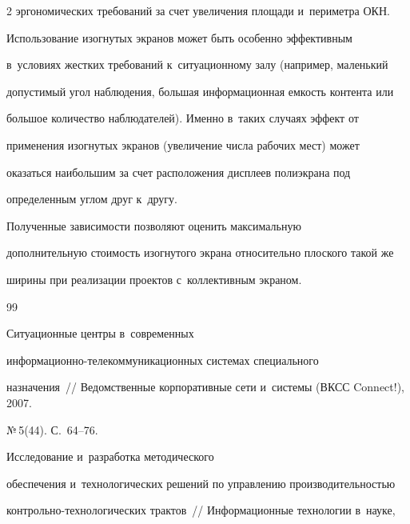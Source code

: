 \begin{multicols}{2}
эргономических требований за счет увеличения площади и~пери\-мет\-ра ОКН.



     Использование изогнутых экранов может быть особенно эффективным

в~условиях жестких требований к~ситуационному залу (например, маленький

допустимый угол наблюдения, большая информационная емкость контента или

большое количество наблюдателей). Именно в~таких случаях эффект от

применения изогнутых экранов (увеличение числа рабочих мест) может

оказаться наибольшим за счет расположения дисплеев полиэкрана под

определенным углом друг к~другу.



     Полученные зависимости позволяют оценить максимальную

дополнительную стоимость изогнутого экрана относительно плоского такой же

ширины при реализации проектов с~коллективным экраном.



\vspace*{-6pt}



{\small\frenchspacing

 {%


 \begin{thebibliography}{99}


 Ситуационные центры в~современных

ин\-фор\-ма\-ци\-он\-но-те\-леком\-му\-ни\-ка\-ци\-он\-ных сис\-те\-мах специального

назначения~// Ведомственные корпоративные сети и~систе\-мы (ВКСС Connect!), 2007.

№\,5(44). С.~64--76.




 Исследование и~разработка методического

обеспечения и~технологических решений по управлению производительностью

конт\-роль\-но-тех\-но\-ло\-ги\-че\-ских трактов~// Информационные технологии в~науке,


\end{thebibliography}}}
\end{multicols}
